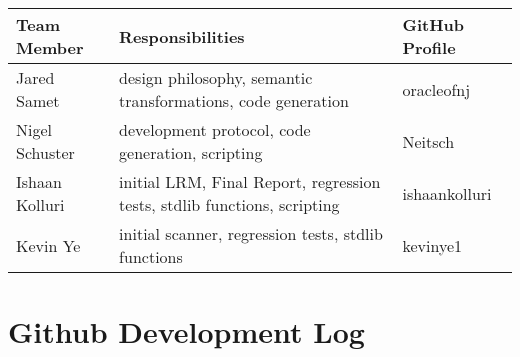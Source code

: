 \begin{tabular}{ | l | l | l |}\hline
  Team Member  & Responsibilities      & GitHub Profile\\ \hline
  Jared Samet & design philosophy, semantic transformations, code generation  & oracleofnj\\
  Nigel Schuster & development protocol, code generation, scripting  & Neitsch\\
  Ishaan Kolluri & initial LRM, Final Report, regression tests, stdlib functions, scripting & ishaankolluri\\
  Kevin Ye & initial scanner, regression tests, stdlib functions & kevinye1\\ \hline

\end{tabular}

\newpage

\section{Github Development Log}


